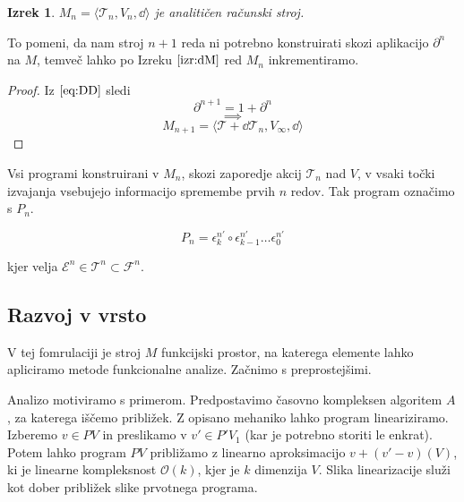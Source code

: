 \documentclass{article}
\newcommand{\II}{\mathbb{I}}
\newcommand{\E}{\mathcal{E}}
\newcommand{\T}{\mathcal{T}}
\newcommand{\F}{\mathcal{F}}
\newcommand{\D}{\partial}
\newtheorem{izrek}{Izrek}[section]
\begin{document}
  \begin{izrek}\label{izr:dM}
	$M_n=\langle\T_n, V_n, \dd\rangle$ je analitičen računski stroj.
  \end{izrek}
  
  To pomeni, da nam stroj $n+1$ reda ni potrebno konstruirati skozi aplikacijo $\D^n$ na $M$, temveč lahko po Izreku $\ref{izr:dM}$ red $M_{n}$ inkrementiramo.

\begin{proof}
	Iz $\eqref{eq:DD}$ sledi	
	$$\D^{n+1}=1+\D^n$$
	$$\implies$$
	$$M_{n+1}=\langle\T+\dd\T_n,V_\infty,\dd\rangle$$
\end{proof}
  
  Vsi programi konstruirani v $M_n$, skozi zaporedje akcij $\T_n$ nad $V$, v vsaki točki izvajanja vsebujejo informacijo spremembe prvih $n$ redov. Tak program označimo s $P_n$.
  
  \begin{equation}
  P_{n} = \epsilon^{n'}_k\circ\epsilon^{n'}_{k-1}\ldots\epsilon^{n'}_0
  \end{equation}
  
kjer velja $\E^n\in\T^n\subset\F^n$.
 
 
  \subsection{Razvoj v vrsto}
  
  V tej fomrulaciji je stroj $M$ funkcijski prostor,  na katerega elemente lahko apliciramo metode funkcionalne analize. Začnimo s preprostejšimi.
  
  Analizo motiviramo s primerom. Predpostavimo časovno kompleksen algoritem $A$, za katerega iščemo približek. Z opisano mehaniko lahko program lineariziramo.
  Izberemo $v\in PV$ in preslikamo v $v'\in P'V_1$ (kar je potrebno storiti le enkrat). Potem lahko program $PV$ približamo z linearno aproksimacijo $v+(v'-v) (V)$, ki je linearne kompleksnost $\mathcal{O}(k)$, kjer je $k$ dimenzija $V$.
  Slika linearizacije služi kot dober približek slike prvotnega programa.
  
\end{document}
